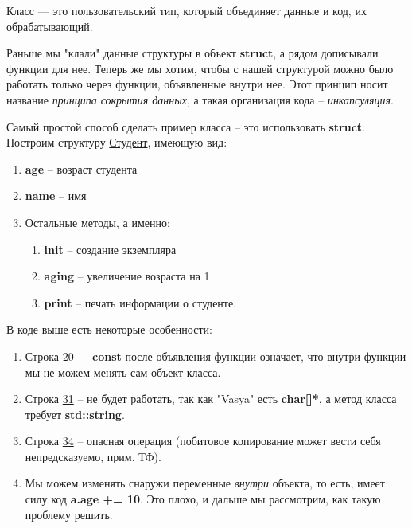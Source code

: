 \begin{lecture}[\lectureSubject]
	\begin{lecSection}[Класс]
		Класс --- это пользовательский тип, который объединяет данные и код, их обрабатывающий.
		
		Раньше мы "клали" данные структуры в объект \textbf{struct}, а рядом дописывали функции для нее. Теперь же мы хотим, чтобы с нашей структурой можно было работать только через функции, объявленные внутри нее. Этот принцип носит название \textit{принципа сокрытия данных}, а такая организация кода -- \textit{инкапсуляция}.
		\end{lecSection}
		
		\begin{lecSection}
		Самый простой способ сделать пример класса -- это использовать \textbf{struct}. Построим структуру \underline{Студент}, имеющую вид:
		\begin{enumerate}
			\item \textbf{age} -- возраст студента
			\item \textbf{name} -- имя
			\item Остальные методы, а именно:
			\begin{enumerate}
				\item \textbf{init} -- создание экземпляра
				\item \textbf{aging} -- увеличение возраста на 1
				\item \textbf{print} -- печать информации о студенте.
			\end{enumerate}
		\end{enumerate}
		
		\newpage
		В коде выше есть некоторые особенности:
		\begin{enumerate}
			\item Строка \underline{20} --- \textbf{const} после объявления функции означает, что внутри функции мы не можем менять сам объект класса.
			\item Строка \underline{31} -- не будет работать, так как "Vasya" есть \textbf{char[]*}, а метод класса требует \textbf{std::string}.
			\item Строка \underline{34} -- опасная операция (побитовое копирование может вести себя непредсказуемо, прим. ТФ).
			\item Мы можем изменять снаружи переменные \textit{внутри} объекта, то есть, имеет силу код \textbf{a.age += 10}. Это плохо, и дальше мы рассмотрим, как такую проблему решить.
		\end{enumerate}
	\end{lecSection}
	

\end{lecture}
